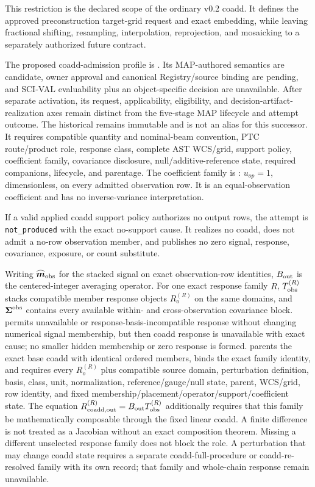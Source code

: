 \documentclass[10pt]{article}
\begin{document}
This restriction is the declared scope of the ordinary v0.2 coadd. It defines
the approved preconstruction target-grid request and exact embedding, while
leaving fractional shifting, resampling, interpolation, reprojection, and
mosaicking to a separately authorized future contract.

The proposed coadd-admission profile is \SCIMapCoaddProfile. Its MAP-authored
semantics are candidate, owner approval and canonical Registry/source binding
are pending, and SCI-VAL evaluability plus an object-specific decision are
unavailable. After separate activation, its request, applicability, eligibility,
and decision-artifact-realization axes remain distinct from the five-stage MAP
lifecycle and attempt outcome.
The historical \SCIMapCoaddProfileHistorical{} remains immutable and is not an
alias for this successor. It requires compatible quantity
and nominal-beam convention, PTC route/product role, response class, complete
AST WCS/grid, support policy, coefficient family, covariance disclosure,
null/additive-reference state, required companions, lifecycle, and parentage.
The coefficient family is
\SCIMapUniformCoaddProfile: \(u_{op}=1\),
dimensionless, on every admitted observation row. It is an equal-observation
coefficient and has no inverse-variance interpretation.

If a valid applied coadd support policy authorizes no output rows, the attempt
is \texttt{not\_produced} with the exact no-support cause. It realizes no coadd,
does not admit a no-row observation member, and publishes no zero signal,
response, covariance, exposure, or count substitute.

Writing \(\widehat{\boldsymbol m}_{\rm obs}\) for the stacked signal on exact
observation-row identities, \(B_{\rm out}\) is the centered-integer averaging
operator. For one exact response family \(R\), \(T_{\rm obs}^{(R)}\) stacks
compatible member response objects \(R_o^{(R)}\) on the same domains, and
\(\boldsymbol\Sigma^{\rm obs}\) contains every available
within- and cross-observation covariance block. \SCIMapBaseCoaddRole{} permits
unavailable or response-basis-incompatible response without changing numerical
signal membership, but then coadd response is unavailable with exact cause;
no smaller hidden membership or zero response is formed.
\SCIMapResponseCoaddRole{} parents the exact base coadd with identical ordered
members, binds the exact family identity, and requires every \(R_o^{(R)}\) plus
compatible source domain, perturbation definition, basis, class, unit,
normalization, reference/gauge/null state, parent, WCS/grid, row identity, and
fixed membership/placement/operator/support/coefficient state. The equation
\(R_{{\rm coadd,out}}^{(R)}=B_{\rm out}T_{\rm obs}^{(R)}\) additionally requires
that this family be mathematically composable through the fixed linear coadd.
A finite difference is not treated as a Jacobian without an exact composition
theorem. Missing a different unselected response family does not block the
role. A perturbation that may change coadd state requires a separate
coadd-full-procedure or coadd-re-resolved family with its own
\SCIMapComparisonSpaceRecordId{} record; that family and whole-chain response
remain unavailable.
\end{document}
